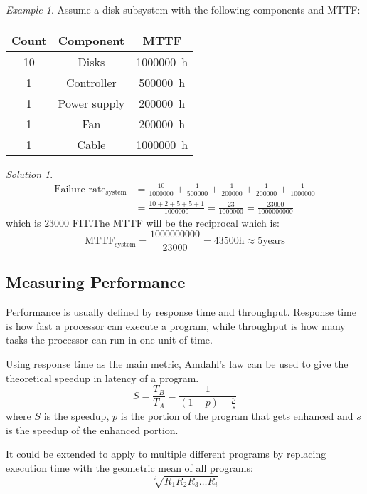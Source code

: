 \documentclass{article}
\theoremstyle{remark}
\newtheorem{example}{Example}[section]
\newtheorem*{solution}{Solution}
\begin{document}
\begin{example}
    Assume a disk subsystem with the following components and MTTF:\@

    \centering
    \begin{tabular}{ c c c }
        \toprule
        Count & Component    & MTTF                \\
        \midrule
        10    & Disks        & \SI{1000000}{\hour} \\
        1     & Controller   & \SI{500000}{\hour}  \\
        1     & Power supply & \SI{200000}{\hour}  \\
        1     & Fan          & \SI{200000}{\hour}  \\
        1     & Cable        & \SI{1000000}{\hour} \\
        \bottomrule
    \end{tabular}
    \begin{solution}
        \begin{align*}
            \text{Failure rate}_{\text{system}} & = \frac{10}{1000000} + \frac{1}{500000} + \frac{1}{200000}+ \frac{1}{200000}+ \frac{1}{1000000} \\
                                                & = \frac{10+2+5+5+1}{1000000} = \frac{23}{1000000} = \frac{23000}{1000000000}
        \end{align*}
        which is \(23000\) FIT.\@ The MTTF will be the reciprocal which is:
        \[
            \text{MTTF}_{\text{system}} = \frac{1000000000}{23000} = 43500 \si{\hour} \approx 5 \text{years}
        \]
    \end{solution}
\end{example}

\subsection{Measuring Performance}
Performance is usually defined by response time and throughput. Response time is how fast a processor can execute a program, while throughput is how many tasks the processor can run in one unit of time.

Using response time as the main metric, Amdahl's law can be used to give the theoretical speedup in latency of a program.
\[
    S = \frac{T_B}{T_A} = \frac{1}{\left(1-p\right) + \frac{p}{s}}
\]
where \(S\) is the speedup, \(p\) is the portion of the program that gets enhanced and \(s\) is the speedup of the enhanced portion.

It could be extended to apply to multiple different programs by replacing execution time with the geometric mean of all programs:
\[
    \sqrt[i]{R_1 R_2 R_3 \ldots R_i}
\]
\end{document}

